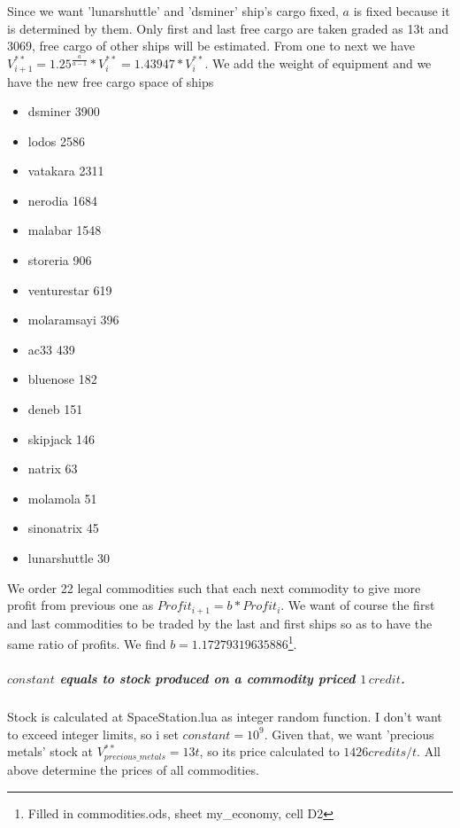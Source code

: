 \documentclass[]{article}
\begin{document}
Since we want 'lunarshuttle' and 'dsminer' ship's cargo fixed, $a$ is fixed because it is determined by them.
Only first and last free cargo are taken graded as 13t and 3069, free cargo of other ships will be estimated. From one to next we have $V^{**}_{i+1}=1.25^{\tfrac{a}{a-1}}*V^{**}_{i}=1.43947*V^{**}_{i}$. We add the weight of equipment and we have the new free cargo space of ships
\begin{itemize}
	\item dsminer	3900
\item 	lodos	2586
	
\item 	vatakara	2311
\item 	nerodia	1684
	
\item 	malabar	1548
\item 	storeria	906
\item 	venturestar	619
	
\item 	molaramsayi	396
\item 	ac33	439
	
\item 	bluenose	182
\item 	deneb	151
\item 	skipjack	146
	
\item 	natrix	63
	
\item 	molamola	51
\item 	sinonatrix	45
\item 	lunarshuttle	30	
\end{itemize}
We order 22 legal commodities such that each next commodity to give more profit from previous one as $Profit_{i+1}=b*Profit_{i}$. We want of course the first and last commodities to be traded by the last and first ships so as to have the same ratio of profits.  We find $b=1.17279319635886$\footnote{Filled in commodities.ods, sheet my\_economy, cell D2}.
\subparagraph{$constant$ equals to stock produced on a commodity priced $1\,credit$.} Stock is calculated at SpaceStation.lua as integer random function. I don't want to exceed integer limits, so i set $constant=10^9$. Given that, we want 'precious metals' stock at $V^{**}_{precious\_metals}=13t$, so its price calculated to $1426 credits/t$. All above determine the prices of all commodities.
\end{document}
